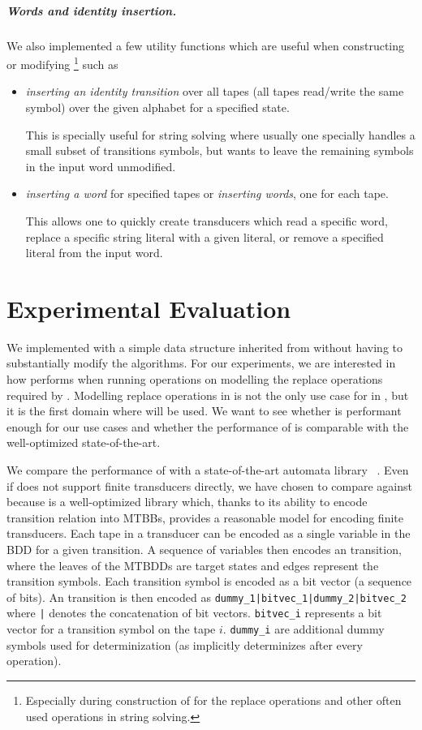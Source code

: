 \paragraph{Words and identity insertion.}
We also implemented a few utility functions which are useful when constructing or modifying \nfts\footnote{Especially during construction of \nfts for the replace operations and other often used operations in string solving.} such as
\begin{itemize}
  \item \emph{inserting an identity transition} over all tapes (all tapes read/write the same symbol) over the given alphabet for a specified state.

  This is specially useful for string solving where usually one specially handles a small subset of transitions symbols, but wants to leave the remaining symbols in the input word unmodified.

  \item \emph{inserting a word} for specified tapes or \emph{inserting words}, one for each tape.

  This allows one to quickly create transducers which read a specific word, replace a specific string literal with a given literal, or remove a specified literal from the input word.
\end{itemize}

\chapter{Experimental Evaluation}
\label{chap:experiments}

We implemented \nfts with a simple data structure inherited from \nfas without having to substantially modify the \nfa algorithms.
For our experiments, we are interested in how \mata performs when running operations on \nfts modelling the replace operations required by \noodler.
Modelling replace operations in \noodler is not the only use case for \nfts in \mata, but it is the first domain where \nfts will be used.
We want to see whether \mata is performant enough for our use cases and whether the performance of \mata is comparable with the well-optimized state-of-the-art.

We compare the performance of \mata with a state-of-the-art automata library \mona~\cite{mona}.
Even if \mona does not support finite transducers directly, we have chosen \mona to compare \mata against because \mona is a well-optimized library which, thanks to its ability to encode transition relation into MTBBs, provides a reasonable model for encoding finite transducers.
Each tape in a transducer can be encoded as a single variable in the BDD for a given transition.
A sequence of variables then encodes an \nft transition, where the leaves of the MTBDDs are target states and edges represent the transition symbols.
Each transition symbol is encoded as a bit vector (a sequence of bits).
An \nft transition is then encoded as \texttt{dummy\_1|bitvec\_1|dummy\_2|bitvec\_2} where \texttt{|} denotes the concatenation of bit vectors. \texttt{bitvec\_i} represents a bit vector for a transition symbol on the tape $i$.
\texttt{dummy\_i} are additional dummy symbols used for determinization (as \mona implicitly determinizes after every operation).

